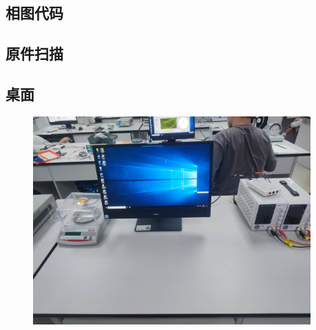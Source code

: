 \documentclass[dvipsnames, svgnames,a4paper,11pt]{article}
\begin{document}
\clearpage
\appendix
\appendixpage
\addappheadtotoc
\subsection*{相图代码}

\subsection*{原件扫描}


\subsection*{桌面}
\begin{figure}[!h]
	\includegraphics[width=0.95\textwidth]{实验3桌面.jpg}
\end{figure}
\end{document}
